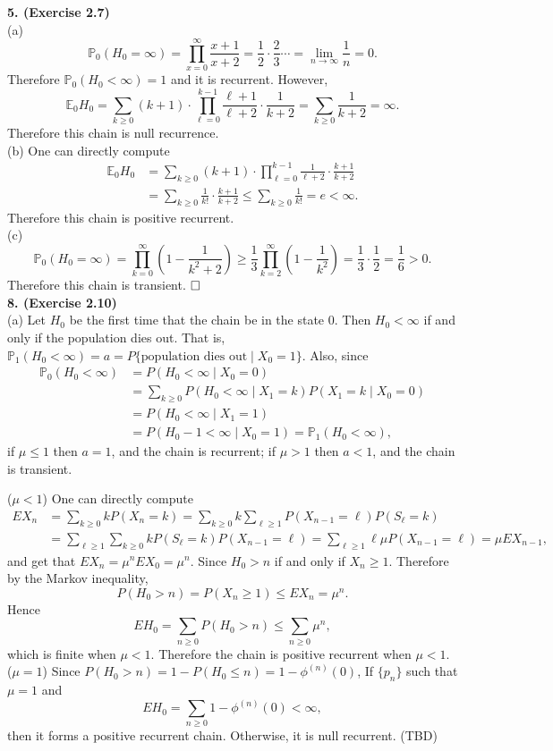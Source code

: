 \documentclass[12pt]{extarticle}
\begin{document}
\noindent
\textbf{5. (Exercise 2.7)} \\
(a) 
\[
\mathbb{P}_0(H_0=\infty)
=
\prod_{x=0}^\infty\frac{x+1}{x+2}
=\frac{1}{2}\cdot\frac{2}{3}\cdots=\lim_{n\rightarrow\infty}\frac{1}{n}=0.
\]
Therefore $\mathbb{P}_0(H_0<\infty)=1$ and it is recurrent.
However,
\[
\mathbb{E}_0H_0
=
\sum_{k\geq 0}(k+1)\cdot\prod_{\ell=0}^{k-1}\frac{\ell+1}{\ell+2}
\cdot\frac{1}{k+2}
=
\sum_{k\geq 0}
\frac{1}{k+2}
=
\infty.
\]
Therefore this chain is null recurrence. \\
(b)
One can directly compute
\[
\begin{aligned}
\mathbb{E}_0H_0
&=
\sum_{k\geq 0}
(k+1)\cdot
\prod_{\ell=0}^{k-1}\frac{1}{\ell+2}
\cdot
\frac{k+1}{k+2} \\&
=
\sum_{k\geq 0}
\frac{1}{k!}\cdot\frac{k+1}{k+2}
\leq
\sum_{k\geq 0}\frac{1}{k!}=e<\infty.
\end{aligned}
\]
Therefore this chain is positive recurrent. \\
(c)
\[
\mathbb{P}_0(H_0=\infty)
=
\prod_{k=0}^\infty\left(1-\frac{1}{k^2+2}\right)
\geq
\frac{1}{3}
\prod_{k=2}^\infty\left(1-\frac{1}{k^2}\right)
=\frac{1}{3}\cdot
\frac{1}{2}=\frac{1}{6}>0.
\]
Therefore this chain is transient.
$\hspace{\fill}\square$ \\

\noindent
\textbf{8. (Exercise 2.10)}\\
(a) Let $H_0$ be the first time that the chain be in the state 0.
Then $H_0<\infty$ if and only if the population dies out.
That is,
$\mathbb{P}_1(H_0<\infty)=a=P\{\text{population dies out}\mid X_0=1\}$.
Also, since
\[
\begin{aligned}
\mathbb{P}_0(H_0<\infty)
&=
P(H_0<\infty\mid X_0=0) \\&
=\sum_{k\geq 0}P(H_0<\infty\mid X_1=k)P(X_1=k\mid X_0=0) \\&
=P(H_0<\infty\mid X_1=1) \\&
=
P(H_0-1<\infty\mid X_0=1)
=
\mathbb{P}_1(H_0<\infty),
\end{aligned}
\]
if $\mu\leq 1$ then $a=1$, and the chain is recurrent; if $\mu>1$ then $a<1$, and the chain is transient.

\noindent
($\mu<1$)
One can directly compute
\[
\begin{aligned}
EX_n &=
\sum_{k\geq 0}kP(X_n=k)
=\sum_{k\geq 0}k\sum_{\ell\geq 1}P(X_{n-1}=\ell)P(S_\ell=k) \\&
=
\sum_{\ell\geq 1}\sum_{k\geq 0}
kP(S_\ell=k)P(X_{n-1}=\ell)
=
\sum_{\ell\geq 1}\ell\mu P(X_{n-1}=\ell)=\mu EX_{n-1},
\end{aligned}
\]
and get that $EX_n=\mu^n EX_0=\mu^n$.
Since $H_0>n$ if and only if $X_n\geq 1$.
Therefore by the Markov inequality,
\[
P(H_0>n)=P(X_n\geq 1)\leq EX_n=\mu^n.
\]
Hence
\[
EH_0=\sum_{n\geq 0}P(H_0>n)\leq \sum_{n\geq 0}\mu^n,
\]
which is finite when $\mu<1$.
Therefore the chain is positive recurrent when $\mu<1$. \\
($\mu=1$) Since $P(H_0>n)=1-P(H_0\leq n)=1-\phi^{(n)}(0)$, If $\{p_n\}$ such that $\mu=1$ and
\[
EH_0=\sum_{n\geq 0}1-\phi^{(n)}(0)<\infty,
\]
then it forms a positive recurrent chain.
Otherwise, it is null recurrent. (TBD) \\
\end{document}
